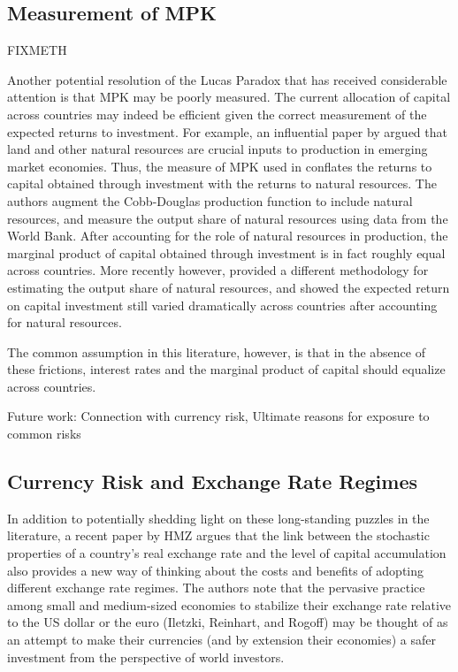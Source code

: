 \documentclass{ar-1col}
\begin{document}
\subsection{Measurement of MPK}

FIXMETH

Another potential resolution of the Lucas Paradox that has received considerable attention is that MPK may be poorly measured. The current allocation of capital across countries may indeed be efficient given the correct measurement of the expected returns to investment. For example, an influential paper by \citet{CaselliFeyrer2007} argued that land and other natural resources are crucial inputs to production in emerging market economies. Thus, the measure of MPK used in \citet{Lucas1990} conflates the returns to capital obtained through investment with the returns to natural resources. The authors augment the Cobb-Douglas production function to include natural resources, and measure the output share of natural resources using data from the World Bank. After accounting for the role of natural resources in production, the marginal product of capital obtained through investment is in fact roughly equal across countries. More recently however, \citet{Monge-Naranjoetal2019} provided a different methodology for estimating the output share of natural resources, and showed the expected return on capital investment still varied dramatically across countries after accounting for natural resources.

The common assumption in this literature, however, is that in the absence of these frictions, interest rates and the marginal product of capital should equalize across countries. 

Future work: Connection with currency risk, Ultimate reasons for exposure to common risks


\subsection{Currency Risk and Exchange Rate Regimes}

In addition to potentially shedding light on these long-standing puzzles in the literature, a recent paper by HMZ argues that the link between the stochastic properties of a country's real exchange rate and the level of capital accumulation also provides a new way of thinking about the costs and benefits of adopting different exchange rate regimes. 
The authors note that the pervasive practice among small and medium-sized economies to stabilize their exchange rate relative to the US dollar or the euro (Iletzki, Reinhart, and Rogoff) may be thought of as an attempt to make their currencies (and by extension their economies) a safer investment from the perspective of world investors. 
\end{document}

